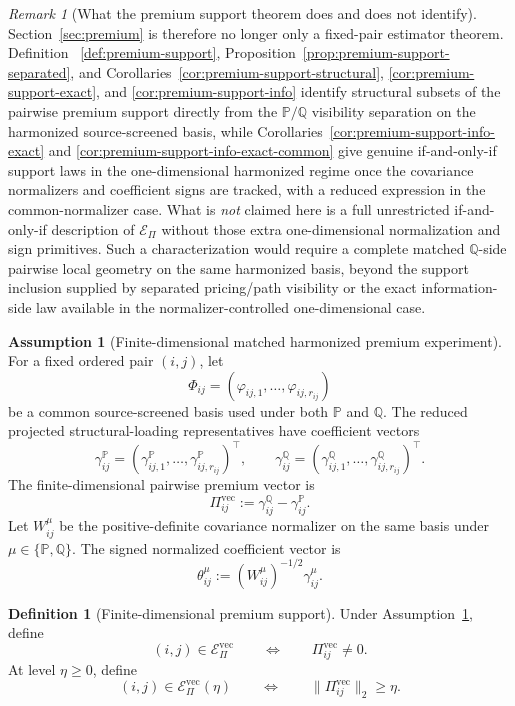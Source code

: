 \documentclass[11pt,a4paper]{amsart}
\theoremstyle{plain}
\theoremstyle{definition}
\newtheorem{definition}[theorem]{Definition}
\newtheorem{assumption}[theorem]{Assumption}
\theoremstyle{remark}
\newtheorem{remark}[theorem]{Remark}
\newcommand{\PP}{\mathbb{P}}
\newcommand{\QQ}{\mathbb{Q}}
\newcommand{\cE}{\mathcal{E}}
\begin{document}
\begin{remark}[What the premium support theorem does and does not identify]\label{rem:premium-support-scope}
Section~\ref{sec:premium} is therefore no longer only a fixed-pair estimator theorem.  Definition~
\ref{def:premium-support}, Proposition~\ref{prop:premium-support-separated}, and
Corollaries~\ref{cor:premium-support-structural}, \ref{cor:premium-support-exact}, and
\ref{cor:premium-support-info} identify structural subsets of the pairwise premium support directly
from the \(\PP/\QQ\) visibility separation on the harmonized source-screened basis, while
Corollaries~\ref{cor:premium-support-info-exact} and
\ref{cor:premium-support-info-exact-common} give genuine if-and-only-if support laws in the
one-dimensional harmonized regime once the covariance normalizers and coefficient signs are
tracked, with a reduced expression in the common-normalizer case.  What is \emph{not} claimed
here is a full unrestricted if-and-only-if description of \(\cE_\Pi\) without those extra
one-dimensional normalization and sign primitives.  Such a characterization would require a
complete matched \(\QQ\)-side pairwise local geometry on the same harmonized basis, beyond the
support inclusion supplied by separated pricing/path visibility or the exact information-side law
available in the normalizer-controlled one-dimensional case.
\end{remark}

\begin{assumption}[Finite-dimensional matched harmonized premium experiment]\label{ass:fd-premium}
For a fixed ordered pair \((i,j)\), let
\[
        \Phi_{ij}=(\varphi_{ij,1},\dots,\varphi_{ij,r_{ij}})
\]
be a common source-screened basis used under both \(\PP\) and \(\QQ\).  The reduced projected
structural-loading representatives have coefficient vectors
\[
        \gamma_{ij}^\PP=(\gamma_{ij,1}^\PP,\dots,\gamma_{ij,r_{ij}}^\PP)^\top,
        \qquad
        \gamma_{ij}^\QQ=(\gamma_{ij,1}^\QQ,\dots,\gamma_{ij,r_{ij}}^\QQ)^\top.
\]
The finite-dimensional pairwise premium vector is
\[
        \Pi_{ij}^{\mathrm{vec}}
        :=
        \gamma_{ij}^\QQ-\gamma_{ij}^\PP.
\]
Let \(W_{ij}^\mu\) be the positive-definite covariance normalizer on the same basis under
\(\mu\in\{\PP,\QQ\}\).  The signed normalized coefficient vector is
\[
        \theta_{ij}^\mu:=(W_{ij}^\mu)^{-1/2}\gamma_{ij}^\mu.
\]
\end{assumption}

\begin{definition}[Finite-dimensional premium support]\label{def:fd-premium-support}
Under Assumption~\ref{ass:fd-premium}, define
\[
        (i,j)\in\cE_\Pi^{\mathrm{vec}}
        \qquad\Longleftrightarrow\qquad
        \Pi_{ij}^{\mathrm{vec}}\ne0.
\]
At level \(\eta\ge0\), define
\[
        (i,j)\in\cE_\Pi^{\mathrm{vec}}(\eta)
        \qquad\Longleftrightarrow\qquad
        \|\Pi_{ij}^{\mathrm{vec}}\|_2\ge\eta.
\]
\end{definition}
\end{document}
